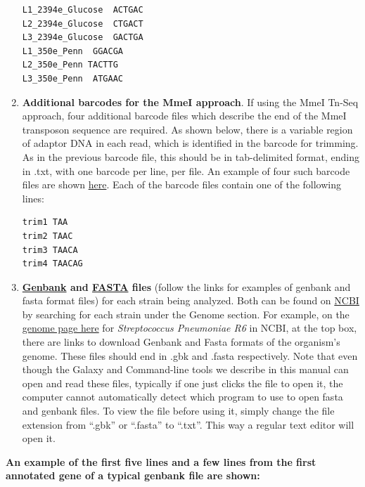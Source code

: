 \documentclass[11pt,]{article}
\begin{document}
\begin{enumerate}
\begin{verbatim}
L1_2394e_Glucose  ACTGAC
L2_2394e_Glucose  CTGACT
L3_2394e_Glucose  GACTGA
L1_350e_Penn  GGACGA
L2_350e_Penn TACTTG
L3_350e_Penn  ATGAAC
\end{verbatim}
\item
  \textbf{Additional barcodes for the MmeI approach}. If using the MmeI
  Tn-Seq approach, four additional barcode files which describe the end
  of the MmeI transposon sequence are required. As shown below, there is
  a variable region of adaptor DNA in each read, which is identified in
  the barcode for trimming. As in the previous barcode file, this should
  be in tab-delimited format, ending in .txt, with one barcode per line,
  per file. An example of four such barcode files are shown
  \href{https://github.com/vanOpijnenLab/magenta-p2/tree/master/example\%20files}{here}.
  Each of the barcode files contain one of the following lines:

\begin{verbatim}
trim1 TAA
trim2 TAAC
trim3 TAACA
trim4 TAACAG
\end{verbatim}
\item
  \textbf{\href{https://www.ncbi.nlm.nih.gov/Sitemap/samplerecord.html}{Genbank}
  and \href{http://zhanglab.ccmb.med.umich.edu/FASTA/}{FASTA} files}
  (follow the links for examples of genbank and fasta format files) for
  each strain being analyzed. Both can be found on
  \href{https://www.ncbi.nlm.nih.gov/pubmed}{NCBI} by searching for each
  strain under the Genome section. For example, on the
  \href{https://www.ncbi.nlm.nih.gov/genome/?term=streptococcus+pneumoniae}{genome
  page here} for \emph{Streptococcus Pneumoniae R6} in NCBI, at the top
  box, there are links to download Genbank and Fasta formats of the
  organism's genome. These files should end in .gbk and .fasta
  respectively. Note that even though the Galaxy and Command-line tools
  we describe in this manual can open and read these files, typically if
  one just clicks the file to open it, the computer cannot automatically
  detect which program to use to open fasta and genbank files. To view
  the file before using it, simply change the file extension from
  ``.gbk'' or ``.fasta'' to ``.txt''. This way a regular text editor
  will open it.
\end{enumerate}

\textbf{An example of the first five lines and a few lines from the
first annotated gene of a typical genbank file are shown:}
\end{document}
